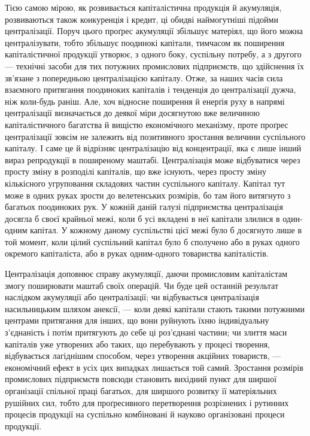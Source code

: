 Тією самою мірою, як розвивається капіталістична продукція
й акумуляція, розвиваються також конкуренція і кредит,
ці обидві наймогутніші підойми централізації. Поруч цього
проґрес акумуляції збільшує матеріял, що його можна централізувати,
тобто збільшує поодинокі капітали, тимчасом як поширення
капіталістичної продукції утворює, з одного боку,
суспільну потребу, а з другого — технічні засоби для тих потужних
промислових підприємств, що здійснення їх зв’язане з попередньою
централізацією капіталу. Отже, за наших часів сила
взаємного притягання поодиноких капіталів і тенденція до централізації
дужча, ніж коли-будь раніш. Але, хоч відносне поширення
й енерґія руху в напрямі централізації визначається до
деякої міри досягнутою вже величиною капіталістичного багатства
й вищістю економічного механізму, проте проґрес централізації
зовсім не залежить від позитивного зростання величини
суспільного капіталу. І саме це й відрізняє централізацію від
концентрації, яка є лише інший вираз репродукції в поширеному
маштабі. Централізація може відбуватися через просту зміну
в розподілі капіталів, що вже існують, через просту зміну кількісного
угруповання складових частин суспільного капіталу.
Капітал тут може в одних руках зрости до велетенських розмірів,
бо там його витягнуто з багатьох поодиноких рук. У кожній
даній галузі підприємства централізація досягла б своєї крайньої
межі, коли б усі вкладені в неї капітали злилися в один-одним
капітал.
У кожному даному суспільстві цієї межі було б
досягнуто лише в той момент, коли цілий суспільний капітал
було б сполучено або в руках одного окремого капіталіста, або
в руках одним-одного товариства капіталістів.

Централізація доповнює справу акумуляції, даючи промисловим
капіталістам змогу поширювати маштаб своїх операцій.
Чи буде цей останній результат наслідком акумуляції або централізації;
чи відбувається централізація насильницьким шляхом
анексії, — коли деякі капітали стають такими потужними
центрами притягання для інших, що вони руйнують їхню індивідуальну
з’єднаність і потім притягують до себе ці роз’єднані
частини; чи злиття маси капіталів уже утворених або таких,
що перебувають у процесі творення, відбувається лагіднішим
способом, через утворення акційних товариств, — економічний
ефект в усіх цих випадках лишається той самий. Зростання розмірів
промислових підприємств повсюди становить вихідний
пункт для ширшої організації спільної праці багатьох, для
ширшого розвитку її матеріяльних рушійних сил, тобто для
проґресивного перетворення розрізнених і рутинних процесів
продукції на суспільно комбіновані й науково організовані
процеси продукції.

